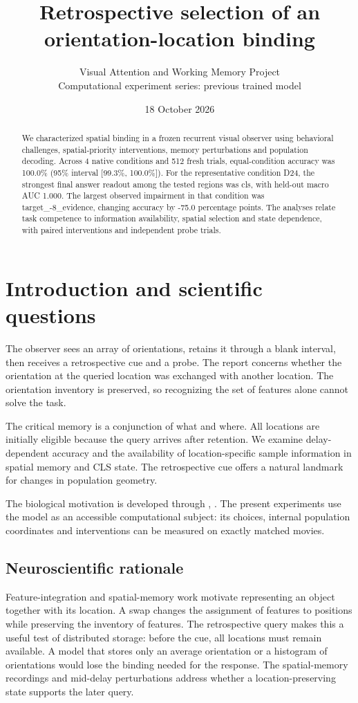 \documentclass[11pt]{article}
\begin{document}
\title{\color{ink}Retrospective selection of an orientation-location binding}
\author{Visual Attention and Working Memory Project\\Computational experiment series: previous trained model}\date{18 October 2026}\maketitle
\begin{abstract}
We characterized spatial binding in a frozen recurrent visual observer using behavioral challenges, spatial-priority interventions, memory perturbations and population decoding. Across 4 native conditions and 512 fresh trials, equal-condition accuracy was 100.0\% (95\% interval [99.3\%, 100.0\%]). For the representative condition D24, the strongest final answer readout among the tested regions was cls, with held-out macro AUC 1.000. The largest observed impairment in that condition was target\_\allowbreak{}-8\_\allowbreak{}evidence, changing accuracy by -75.0 percentage points. The analyses relate task competence to information availability, spatial selection and state dependence, with paired interventions and independent probe trials.
\end{abstract}
\section{Introduction and scientific questions}
The observer sees an array of orientations, retains it through a blank interval, then receives a retrospective cue and a probe. The report concerns whether the orientation at the queried location was exchanged with another location. The orientation inventory is preserved, so recognizing the set of features alone cannot solve the task.

The critical memory is a conjunction of what and where. All locations are initially eligible because the query arrives after retention. We examine delay-dependent accuracy and the availability of location-specific sample information in spatial memory and CLS state. The retrospective cue offers a natural landmark for changes in population geometry.

The biological motivation is developed through \cite{treisman}, \cite{spatial}. The present experiments use the model as an accessible computational subject: its choices, internal population coordinates and interventions can be measured on exactly matched movies.

\subsection{Neuroscientific rationale}
Feature-integration and spatial-memory work motivate representing an object together with its location. A swap changes the assignment of features to positions while preserving the inventory of features. The retrospective query makes this a useful test of distributed storage: before the cue, all locations must remain available. A model that stores only an average orientation or a histogram of orientations would lose the binding needed for the response. The spatial-memory recordings and mid-delay perturbations address whether a location-preserving state supports the later query.
\end{document}
